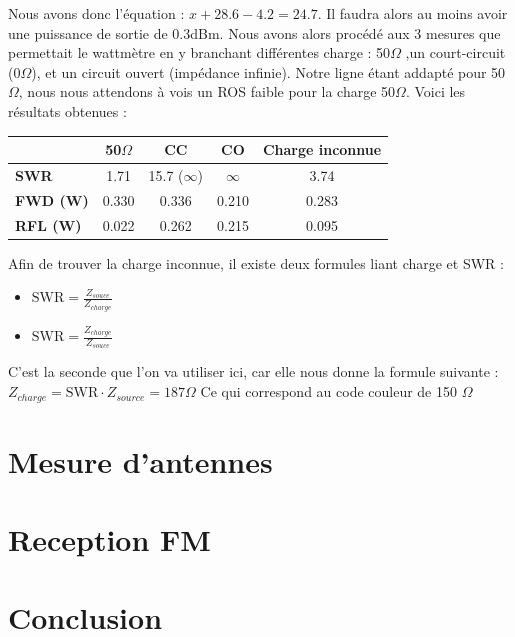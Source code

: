 \documentclass[a4paper,12pt]{report}            %
\begin{document}
Nous avons donc l'équation : $x+28.6-4.2=24.7$. Il faudra alors au moins avoir une puissance de sortie de 0.3dBm.
Nous avons alors procédé aux 3 mesures que permettait le wattmètre en y branchant différentes charge : 50$\Omega$ ,un court-circuit (0$\Omega$), et un circuit ouvert (impédance infinie).
Notre ligne étant addapté pour 50$\Omega$, nous nous attendons à vois un ROS faible pour la charge 50$\Omega$. Voici les 
résultats obtenues :

\begin{center}
	\begin{tabular}{||p{4cm}||*{4}{c|}|}
		\hline
		\bfseries         & 50$\Omega$ & CC              & CO       & Charge inconnue \\
		\hline
		\hline
		\bfseries SWR     & 1.71       & 15.7 ($\infty$) & $\infty$ & 3.74            \\
		\hline
		\bfseries FWD (W) & 0.330      & 0.336           & 0.210    & 0.283           \\
		\hline
		\bfseries RFL (W) & 0.022      & 0.262           & 0.215    & 0.095           \\
		\hline
		\hline
	\end{tabular}
\end{center}

Afin de trouver la charge inconnue, il existe deux formules liant charge et SWR :
\begin{itemize}
    \item $\mbox{SWR} = \frac{Z_{souce}}{Z_{charge}}$
    \item $\mbox{SWR} = \frac{Z_{charge}}{Z_{souce}}$
\end{itemize}

C'est la seconde que l'on va utiliser ici, car elle nous donne la formule suivante : 
$Z_{charge} = \mbox{SWR} \cdot Z_{source} = 187\Omega$
Ce qui correspond au code couleur de 150 $\Omega$

\chapter{Mesure d'antennes}

\chapter{Reception FM}

\chapter{Conclusion}
\end{document}
